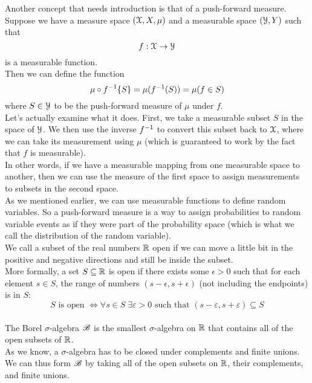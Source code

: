 \documentclass[12pt]{article}
\begin{document}
    Another concept that needs introduction
    is that of a push-forward measure. \\
    Suppose we have a measure space
    $(\mathcal{X}, X, \mu)$
    and a measurable space $(\mathcal{Y}, Y)$
    such that
    \[ f: \mathcal{X} \to \mathcal{Y} \]
    is a measurable function. \\
    Then we can define the function
    \[ \mu \circ f^{-1} \{S\} = \mu(f^{-1} (S)) 
    = \mu(f \in S) \]
    where $S \in \mathcal{Y}$ to be the push-forward
    measure of $\mu$ under $f$. \\
    Let's actually examine what it does.
    First, we take a measurable subset $S$
    in the space of $\mathcal{Y}$.
    We then use the inverse $f^{-1}$ to convert
    this subset back to $\mathcal{X}$,
    where we can take its measurement using $\mu$
    (which is guaranteed to work by the fact
    that $f$ is measurable). \\
    In other words, if we have a measurable
    mapping from one measurable space to another,
    then we can use the measure of the first
    space to assign measurements to subsets
    in the second space. \\
    As we mentioned earlier,
    we can use measurable functions to define
    random variables.
    So a push-forward measure is a way to assign
    probabilities to random variable events
    as if they were part of the probability 
    space (which is what we call the distribution
    of the random variable). \\

    We call a subset of the real numbers $\mathbb{R}$
    open if we can move a little bit in the
    positive and negative directions and still
    be inside the subset. \\
    More formally, a set $S \subseteq \mathbb{R}$
    is open if there exists some $\epsilon > 0$
    such that for each element $s \in S$,
    the range of numbers
    $(s - \epsilon, s + \epsilon)$
    (not including the endpoints) is in $S$:
    \[
    S \text{ is open } \iff 
    \forall s \in S\; \exists \varepsilon > 0 
    \text{ such that } 
    (s - \varepsilon, s + \varepsilon) 
    \subseteq S \] \\

    The Borel $\sigma$-algebra $\mathscr{B}$
    is the smallest $\sigma$-algebra
    on $\mathbb{R}$ that contains
    all of the open subsets of $\mathbb{R}$. \\
    As we know, a $\sigma$-algebra has to be closed
    under complements and finite unions. 
    We can thus form $\mathscr{B}$ by taking all
    of the open subsets on $\mathbb{R}$,
    their complements,
    and finite unions. \\
    
\end{document}
